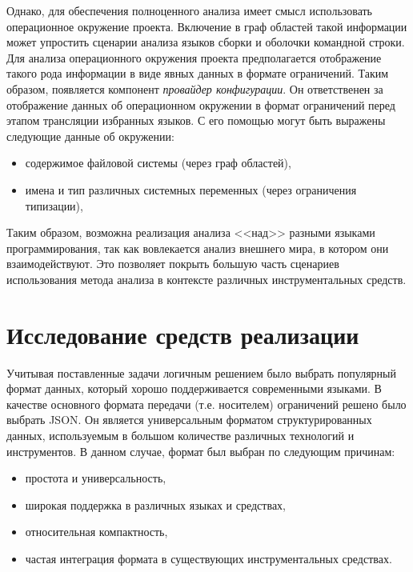 Однако, для обеспечения полноценного анализа имеет смысл использовать операционное окружение
проекта. Включение в граф областей такой информации может упростить сценарии анализа
языков сборки и оболочки командной строки.
Для анализа операционного окружения проекта предполагается отображение такого рода информации в виде
явных данных в формате ограничений. Таким образом, появляется компонент \textit{провайдер конфигурации}.
Он ответственен за отображение данных об операционном окружении в формат ограничений перед
этапом трансляции избранных языков. С его помощью могут быть выражены следующие данные об окружении:
\begin{itemize}
    \item содержимое файловой системы (через граф областей),
    \item имена и тип различных системных переменных (через ограничения типизации),
\end{itemize}

Таким образом, возможна реализация анализа <<над>> разными языками программирования, так как
 вовлекается анализ внешнего мира, в котором они взаимодействуют. Это позволяет
 покрыть большую часть сценариев использования метода анализа в контексте различных
 инструментальных средств. 


\section{Исследование средств реализации}

Учитывая поставленные задачи
логичным решением было выбрать популярный формат данных, который хорошо поддерживается современными
языками. В качестве основного формата передачи (т.е. носителем) ограничений решено было выбрать JSON.
Он является универсальным форматом структурированных данных, используемым в большом количестве
различных технологий и инструментов. В данном случае, формат был выбран по следующим причинам:
\begin{itemize}
    \item простота и универсальность,
    \item широкая поддержка в различных языках и средствах,
    \item относительная компактность,
    \item частая интеграция формата в существующих инструментальных средствах.
\end{itemize}

